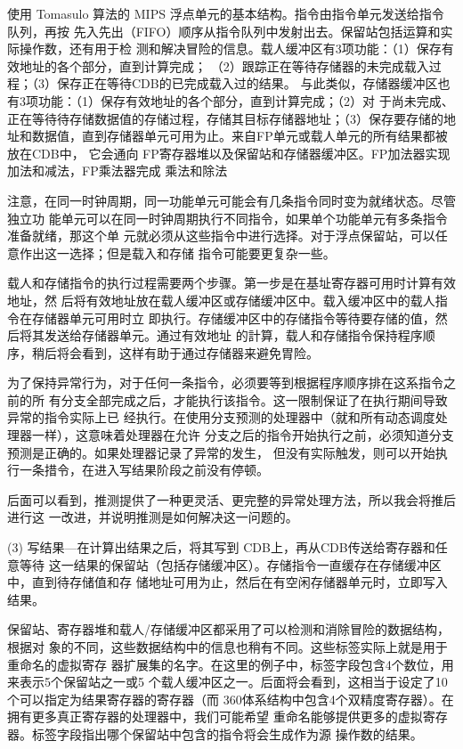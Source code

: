 使用 Tomasulo 算法的 MIPS 浮点单元的基本结构。指令由指令单元发送给指令队列，再按
先入先出（FIFO）顺序从指令队列中发射出去。保留站包括运算和实际操作数，还有用于检
测和解决冒险的信息。载人缓冲区有3项功能：（1）保存有效地址的各个部分，直到计算完成；
（2）跟踪正在等待存储器的未完成载入过程；（3）保存正在等待CDB的已完成载入过的结果。
与此类似，存储器缓冲区也有3项功能：（1）保存有效地址的各个部分，直到计算完成；（2）对
于尚未完成、正在等待待存储数据值的存储过程，存储其目标存储器地址；（3）保存要存储的地
址和数据值，直到存储器单元可用为止。来自FP单元或载人单元的所有结果都被放在CDB中，
它会通向 FP寄存器堆以及保留站和存储器缓冲区。FP加法器实现加法和减法，FP乘法器完成
乘法和除法

注意，在同一时钟周期，同一功能单元可能会有几条指令同时变为就绪状态。尽管独立功
能单元可以在同一时钟周期执行不同指令，如果单个功能单元有多条指令准备就绪，那这个单
元就必须从这些指令中进行选择。对于浮点保留站，可以任意作出这一选择；但是载入和存储
指令可能要更复杂一些。

载人和存储指令的执行过程需要两个步骤。第一步是在基址寄存器可用时计算有效地址，然
后将有效地址放在载人缓冲区或存储缓冲区中。载入缓冲区中的载人指令在存储器单元可用时立
即执行。存储缓冲区中的存储指令等待要存储的值，然后将其发送给存储器单元。通过有效地址
的計算，载人和存储指令保持程序顺序，稍后将会看到，这样有助于通过存储器来避免胃险。

为了保持异常行为，对于任何一条指令，必须要等到根据程序顺序排在这系指令之前的所
有分支全部完成之后，才能执行该指令。这一限制保证了在执行期间导致异常的指令实际上已
经执行。在使用分支预测的处理器中（就和所有动态调度处理器一样），这意味着处理器在允许
分支之后的指令开始执行之前，必须知道分支预测是正确的。如果处理器记录了异常的发生，
但没有实际触发，则可以开始执行一条措令，在进入写结果阶段之前没有停顿。

后面可以看到，推测提供了一种更灵活、更完整的异常处理方法，所以我会将推后进行这
一改进，并说明推测是如何解决这一问题的。

(3) 写结果—在计算出结果之后，将其写到 CDB上，再从CDB传送给寄存器和任意等待
这一结果的保留站（包括存储缓冲区）。存储指令一直缓存在存储缓冲区中，直到待存储值和存
储地址可用为止，然后在有空闲存储器单元时，立即写入结果。

保留站、寄存器堆和载人/存储缓冲区都采用了可以检测和消除冒险的数据结构，根据对
象的不同，这些数据结构中的信息也稍有不同。这些标签实际上就是用于重命名的虚拟寄存
器扩展集的名字。在这里的例子中，标签字段包含4个数位，用来表示5个保留站之一或5
个载人缓冲区之一。后面将会看到，这相当于设定了10个可以指定为结果寄存器的寄存器（而
360体系结构中包含4个双精度寄存器）。在拥有更多真正寄存器的处理器中，我们可能希望
重命名能够提供更多的虚拟寄存器。标签字段指出哪个保留站中包含的指令将会生成作为源
操作数的结果。

